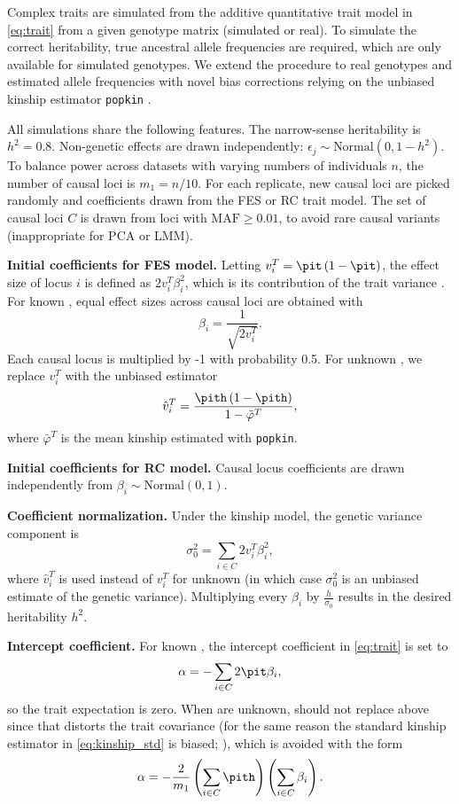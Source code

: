 \documentclass[11pt]{article}
\begin{document}
Complex traits are simulated from the additive quantitative trait model in \cref{eq:trait} from a given genotype matrix (simulated or real).
To simulate the correct heritability, true ancestral allele frequencies \pit are required, which are only available for simulated genotypes.
We extend the procedure to real genotypes and estimated allele frequencies \pith with novel bias corrections relying on the unbiased kinship estimator \texttt{popkin} \citep{ochoa_estimating_2021}.

All simulations share the following features.
The narrow-sense heritability is $h^2 = 0.8$.
Non-genetic effects are drawn independently: $\epsilon_j \sim \text{Normal}(0, 1 - h^2 )$.
To balance power across datasets with varying numbers of individuals $n$, the number of causal loci is $m_1 = n / 10$.
For each replicate, new causal loci are picked randomly and coefficients drawn from the FES or RC trait model.
The set of causal loci $C$ is drawn from loci with $\text{MAF} \ge 0.01$, to avoid rare causal variants (inappropriate for PCA or LMM).

\textbf{Initial coefficients for FES model.}
Letting $v_i^T = \pit \left( 1 - \pit \right)$, the effect size of locus $i$ is defined as $2 v_i^T \beta_i^2$, which is its contribution of the trait variance \citep{park_estimation_2010}.
For known \pit, equal effect sizes across causal loci are obtained with
$$
\beta_i = \frac{1}{ \sqrt{ 2 v_i^T } }.
$$
Each causal locus is multiplied by -1 with probability 0.5.
For unknown \pit, we replace $v_i^T$ with the unbiased estimator \citep{ochoa_estimating_2021}
\begin{equation*}
  \hat{v}_i^T
  =
  \frac{ \pith \left( 1 - \pith \right) }{ 1 - \bar{\varphi}^T } 
  ,
\end{equation*}
where $\bar{\varphi}^T$ is the mean kinship estimated with \texttt{popkin}.

\textbf{Initial coefficients for RC model.}
Causal locus coefficients are drawn independently from $\beta_i \sim \text{Normal}( 0, 1 )$.

\textbf{Coefficient normalization.}
Under the kinship model, the genetic variance component is
$$
\sigma^2_0
=
\sum_{i \in C} 2 v_i^T \beta_i^2 ,
$$
where $\hat{v}_i^T$ is used instead of $v_i^T$ for unknown \pit (in which case $\sigma^2_0$ is an unbiased estimate of the genetic variance).
Multiplying every $\beta_i$ by $\frac{h}{ \sigma_0 }$ results in the desired heritability $h^2$.

\textbf{Intercept coefficient.}
For known \pit, the intercept coefficient in \cref{eq:trait} is set to
$$
\alpha = - \sum_{i \in C} 2 \pit \beta_i,
$$
so the trait expectation is zero.
When \pit are unknown, \pith should not replace \pit above since that distorts the trait covariance (for the same reason the standard kinship estimator in \cref{eq:kinship_std} is biased; \cite{ochoa_estimating_2021}), which is avoided with the form
$$
\alpha = - \frac{2}{m_1} \left( \sum_{i \in C} \pith \right) \left(\sum_{i \in C} \beta_i \right).
$$
\end{document}
